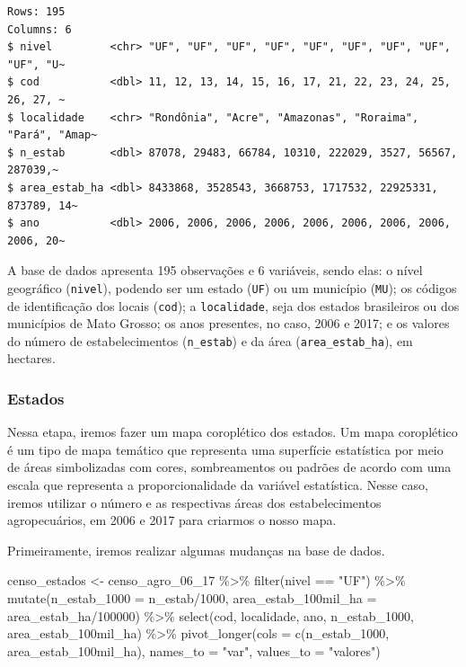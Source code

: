 \documentclass[
  brazilian,
]{book}
\newenvironment{Shaded}{\begin{snugshade}}{\end{snugshade}}
\newcommand{\AttributeTok}[1]{\textcolor[rgb]{0.77,0.63,0.00}{#1}}
\newcommand{\DecValTok}[1]{\textcolor[rgb]{0.00,0.00,0.81}{#1}}
\newcommand{\FunctionTok}[1]{\textcolor[rgb]{0.00,0.00,0.00}{#1}}
\newcommand{\NormalTok}[1]{#1}
\newcommand{\OtherTok}[1]{\textcolor[rgb]{0.56,0.35,0.01}{#1}}
\newcommand{\SpecialCharTok}[1]{\textcolor[rgb]{0.00,0.00,0.00}{#1}}
\newcommand{\StringTok}[1]{\textcolor[rgb]{0.31,0.60,0.02}{#1}}
\begin{document}
\begin{verbatim}
Rows: 195
Columns: 6
$ nivel         <chr> "UF", "UF", "UF", "UF", "UF", "UF", "UF", "UF", "UF", "U~
$ cod           <dbl> 11, 12, 13, 14, 15, 16, 17, 21, 22, 23, 24, 25, 26, 27, ~
$ localidade    <chr> "Rondônia", "Acre", "Amazonas", "Roraima", "Pará", "Amap~
$ n_estab       <dbl> 87078, 29483, 66784, 10310, 222029, 3527, 56567, 287039,~
$ area_estab_ha <dbl> 8433868, 3528543, 3668753, 1717532, 22925331, 873789, 14~
$ ano           <dbl> 2006, 2006, 2006, 2006, 2006, 2006, 2006, 2006, 2006, 20~
\end{verbatim}

A base de dados apresenta 195 observações e 6 variáveis, sendo elas: o nível geográfico (\texttt{nivel}), podendo ser um estado (\texttt{UF}) ou um município (\texttt{MU}); os códigos de identificação dos locais (\texttt{cod}); a \texttt{localidade}, seja dos estados brasileiros ou dos municípios de Mato Grosso; os anos presentes, no caso, 2006 e 2017; e os valores do número de estabelecimentos (\texttt{n\_estab}) e da área (\texttt{area\_estab\_ha}), em hectares.

\hypertarget{estados-1}{%
\subsubsection*{Estados}\label{estados-1}}

Nessa etapa, iremos fazer um mapa coroplético dos estados. Um mapa coroplético é um tipo de mapa temático que representa uma superfície estatística por meio de áreas simbolizadas com cores, sombreamentos ou padrões de acordo com uma escala que representa a proporcionalidade da variável estatística. Nesse caso, iremos utilizar o número e as respectivas áreas dos estabelecimentos agropecuários, em 2006 e 2017 para criarmos o nosso mapa.

Primeiramente, iremos realizar algumas mudanças na base de dados.

\begin{Shaded}
\begin{Highlighting}[]
\NormalTok{censo\_estados }\OtherTok{\textless{}{-}}\NormalTok{ censo\_agro\_06\_17 }\SpecialCharTok{\%\textgreater{}\%} 
  \FunctionTok{filter}\NormalTok{(nivel }\SpecialCharTok{==} \StringTok{"UF"}\NormalTok{) }\SpecialCharTok{\%\textgreater{}\%} 
  \FunctionTok{mutate}\NormalTok{(}\AttributeTok{n\_estab\_1000 =}\NormalTok{ n\_estab}\SpecialCharTok{/}\DecValTok{1000}\NormalTok{,}
         \AttributeTok{area\_estab\_100mil\_ha =}\NormalTok{ area\_estab\_ha}\SpecialCharTok{/}\DecValTok{100000}\NormalTok{) }\SpecialCharTok{\%\textgreater{}\%} 
  \FunctionTok{select}\NormalTok{(cod, localidade, ano, n\_estab\_1000, area\_estab\_100mil\_ha) }\SpecialCharTok{\%\textgreater{}\%} 
  \FunctionTok{pivot\_longer}\NormalTok{(}\AttributeTok{cols =} \FunctionTok{c}\NormalTok{(n\_estab\_1000, area\_estab\_100mil\_ha),}
               \AttributeTok{names\_to =} \StringTok{"var"}\NormalTok{,}
               \AttributeTok{values\_to =} \StringTok{"valores"}\NormalTok{)}
\end{Highlighting}
\end{Shaded}
\end{document}
